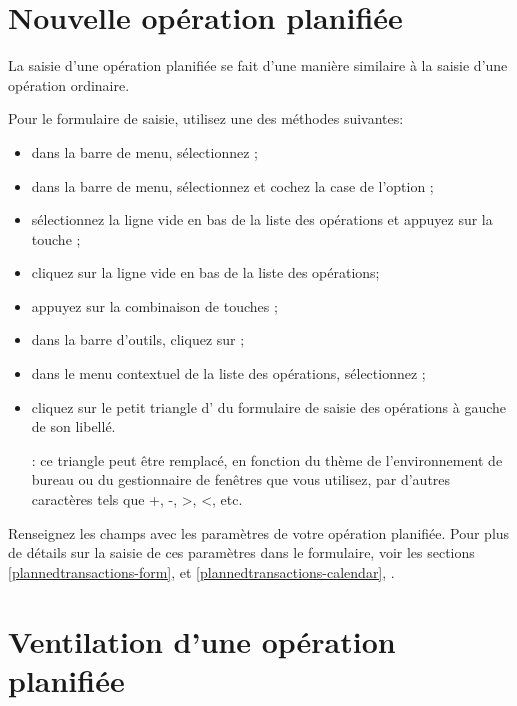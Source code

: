 \section{Nouvelle opération planifiée\label{plannedtransactions-new}}

La saisie d'une opération planifiée se fait d'une manière similaire à la saisie d'une opération ordinaire.

Pour  le formulaire de saisie, utilisez une des méthodes suivantes:
\begin{itemize}
	\item dans la barre de menu, sélectionnez ;
	\item dans la barre de menu, sélectionnez  et cochez la case de l'option ;
	\item sélectionnez la ligne vide en bas de la liste des opérations et appuyez sur la touche ;
	\item cliquez sur la ligne vide en bas de la liste des opérations;
	\item appuyez sur la combinaison de touches ;
	\item dans la barre d'outils, cliquez sur ;
	\item dans le menu contextuel de la liste des opérations, sélectionnez ;
	\item cliquez sur le petit triangle d' du formulaire de saisie des opérations à gauche de son libellé.
	
	\Note{}: ce triangle peut être remplacé, en fonction du thème de l'environnement de bureau ou du gestionnaire de fenêtres que vous utilisez, par d'autres caractères tels que +, -, >, <, etc.
\end{itemize}

Renseignez les champs avec les paramètres de votre opération planifiée. Pour plus de détails sur la saisie de ces paramètres dans le formulaire, voir les sections \vref{plannedtransactions-form},  et \vref{plannedtransactions-calendar}, .


\section{Ventilation d'une opération planifiée\label{plannedtransactions-breakdown}}

